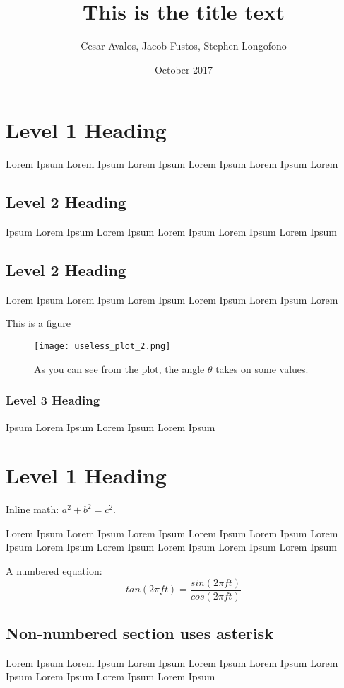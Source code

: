 \documentclass{article}
\title{This is the title text}
\author{Cesar Avalos, Jacob Fustos, Stephen Longofono}
\date{October 2017}
\begin{document}
\maketitle

\section{Level 1 Heading}

Lorem Ipsum Lorem Ipsum Lorem Ipsum Lorem Ipsum Lorem Ipsum Lorem 
\subsection{Level 2 Heading}
Ipsum Lorem Ipsum Lorem Ipsum Lorem Ipsum Lorem Ipsum Lorem Ipsum 
\subsection{Level 2 Heading}
Lorem Ipsum Lorem Ipsum Lorem Ipsum Lorem Ipsum Lorem Ipsum Lorem 

This is a figure

\begin{figure}[h!] %
    \centering
    \texttt{[image: useless\_plot\_2.png]}
    \caption{As you can see from the plot, the angle $\theta$ takes on some values.}
    \label{fig:vertex_setup}
\end{figure}

\subsubsection{Level 3 Heading}
Ipsum Lorem Ipsum Lorem Ipsum Lorem Ipsum

\section{Level 1 Heading}

Inline math: $a^2 + b^2 = c^2$.

Lorem Ipsum Lorem Ipsum Lorem Ipsum Lorem Ipsum Lorem Ipsum Lorem Ipsum Lorem Ipsum Lorem Ipsum Lorem Ipsum Lorem Ipsum Lorem Ipsum 

A numbered equation:
\begin{equation}
    tan(2\pi ft) = \frac{sin(2\pi ft)}{cos(2\pi ft)}
\end{equation}

\subsection*{Non-numbered section uses asterisk}
Lorem Ipsum Lorem Ipsum Lorem Ipsum Lorem Ipsum Lorem Ipsum Lorem Ipsum Lorem Ipsum Lorem Ipsum Lorem Ipsum
\end{document}
